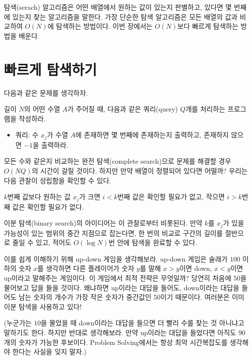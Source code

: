 탐색(serach) 알고리즘은 어떤 배열에서 원하는 값이 있는지 판별하고, 있다면 몇 번째에 있는지 찾는 알고리즘을 말한다. 가장 단순한 탐색 알고리즘은 모든 배열의 값과 비교하여 $O(N)$에 탐색하는 방법이다. 이번 장에서는 $O(N)$보다 빠르게 탐색하는 방법을 배운다.

\section{빠르게 탐색하기}
다음과 같은 문제를 생각하자.
\begin{example} \label{ex: search-query}
    길이 $N$의 어떤 수열 $A$가 주어질 때, 다음과 같은 쿼리(query) $Q$개를 처리하는 프로그램을 작성하라.
    \begin{itemize}
        \item 쿼리: 수 $x_j$가 수열 $A$에 존재하면 몇 번째에 존재하는지 출력하고, 존재하지 않으면 $-1$을 출력하라.
    \end{itemize}
\end{example}

모든 수와 같은지 비교하는 완전 탐색(complete search)으로 문제를 해결할 경우 $O(NQ)$의 시간이 걸릴 것이다. 하지만 만약 배열이 정렬되어 있다면 어떨까? 우리는 다음 관찰이 성립함을 확인할 수 있다.

\begin{obs}
    $k$번째 값보다 원하는 값 $x_j$가 크면 $i<k$번째 값은 확인할 필요가 없고, 작으면 $i>k$번째 값은 확인할 필요가 없다.
\end{obs}

이분 탐색(binary search)의 아이디어는 이 관찰로부터 비롯된다. 만약 $k$를 $x_j$가 있을 가능성이 있는 범위의 중간 지점으로 잡는다면, 한 번의 비교로 구간의 길이를 절반으로 줄일 수 있고, 적어도 $O(\log N)$번 안에 탐색을 완료할 수 있다.

이를 쉽게 이해하기 위해 up-down 게임을 생각해보라. up-down 게임은 술래가 $100$ 이하의 숫자 $x$를 생각하면 다른 플레이어가 숫자 $y$를 말해 $x>y$이면 down, $x<y$이면 up이라고 말해주는 게임이다. 이 게임에서 최적 전략은 무엇일까? 당연히 처음에 $50$을 물어보고 답을 들을 것이다. 왜냐하면 up이라는 대답을 들어도, down이라는 대답을 들어도 남는 숫자의 개수가 가장 작은 숫자가 중간값인 $50$이기 때문이다. 여러분은 이미 이분 탐색을 사용하고 있다!

(누군가는 $10$을 물었을 때 down이라는 대답을 들으면 더 빨리 수를 찾는 것 아니냐고 말하기도 한다. 하지만 반대로 생각해보라. 만약 up이라는 대답을 들었다면 아직도 $90$개의 숫자가 가능한 후보이다. Problem Solving에서는 항상 최악 시간복잡도를 생각해야 한다는 사실을 잊지 말자.)

